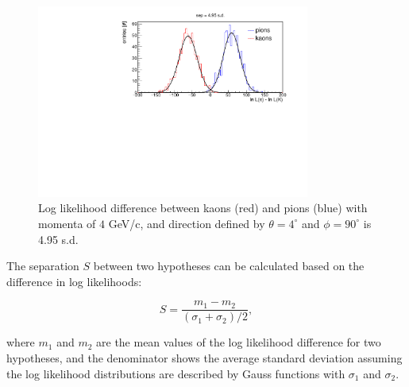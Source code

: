 \begin{figure}[!h]
\centering
\includegraphics[clip, trim=0cm 0cm 0cm 0.7cm, width=0.8\textwidth]{pics/hLnDiff.pdf}
\caption{\label{pic:sepLUT}
Log likelihood difference between kaons (red) and pions (blue) with momenta of $4$ GeV/c, and direction defined by $\theta = 4^{\circ}$ and $\phi = 90^{\circ}$ is 4.95 s.d.
}
\end{figure}

The separation $S$ between two hypotheses can be calculated based on the difference in log likelihoods:

\begin{equation}
S = \frac{m_{1}-m_{2}}{(\sigma_{1} + \sigma_{2})/2},
\end{equation}

\noindent where $m_{1}$ and $m_{2}$ are the mean values of the log likelihood difference for two hypotheses, and the denominator shows the average standard deviation assuming the log likelihood distributions are described by Gauss functions with $\sigma_{1}$ and $\sigma_{2}$.